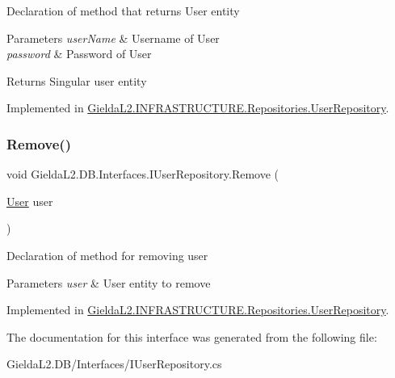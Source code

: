 Declaration of method that returns User entity 


\begin{DoxyParams}{Parameters}
{\em user\+Name} & Username of User\\
\hline
{\em password} & Password of User\\
\hline
\end{DoxyParams}
\begin{DoxyReturn}{Returns}
Singular user entity
\end{DoxyReturn}


Implemented in \mbox{\hyperlink{class_gielda_l2_1_1_i_n_f_r_a_s_t_r_u_c_t_u_r_e_1_1_repositories_1_1_user_repository_a6ddb02c156ab0944804a41a5a9531482}{Gielda\+L2.\+I\+N\+F\+R\+A\+S\+T\+R\+U\+C\+T\+U\+R\+E.\+Repositories.\+User\+Repository}}.

\mbox{\label{interface_gielda_l2_1_1_d_b_1_1_interfaces_1_1_i_user_repository_ad353a86a583d55065532459823c413f2}} 
\subsubsection{\texorpdfstring{Remove()}{Remove()}}
{\footnotesize\ttfamily void Gielda\+L2.\+D\+B.\+Interfaces.\+I\+User\+Repository.\+Remove (\begin{DoxyParamCaption}\item[{\mbox{\hyperlink{class_gielda_l2_1_1_d_b_1_1_entities_1_1_user}{User}}}]{user }\end{DoxyParamCaption})}



Declaration of method for removing user 


\begin{DoxyParams}{Parameters}
{\em user} & User entity to remove\\
\hline
\end{DoxyParams}


Implemented in \mbox{\hyperlink{class_gielda_l2_1_1_i_n_f_r_a_s_t_r_u_c_t_u_r_e_1_1_repositories_1_1_user_repository_a8715ce2a146a846905609162c41a6483}{Gielda\+L2.\+I\+N\+F\+R\+A\+S\+T\+R\+U\+C\+T\+U\+R\+E.\+Repositories.\+User\+Repository}}.



The documentation for this interface was generated from the following file\+:\begin{DoxyCompactItemize}
\item 
Gielda\+L2.\+D\+B/\+Interfaces/I\+User\+Repository.\+cs\end{DoxyCompactItemize}
